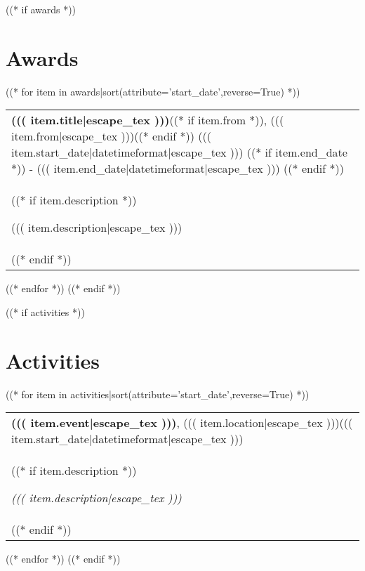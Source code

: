 \documentclass[a4paper, oneside, final]{scrartcl} %
\begin{document}
\begin{center}
((* if awards *))
\section{Awards}

((* for item in awards|sort(attribute='start_date',reverse=True) *))
\begin{tabularx}{0.97\linewidth}{X}
\textbf{((( item.title|escape_tex )))}((* if item.from *)), ((( item.from|escape_tex )))((* endif *)) \hfill ((( item.start_date|datetimeformat|escape_tex ))) ((* if item.end_date *)) - ((( item.end_date|datetimeformat|escape_tex ))) ((* endif *)) \\
((* if item.description *)) \hspace*{\fill}\begin{minipage}{\linewidth-0.5cm} ((( item.description|escape_tex ))) \end{minipage} \\((* endif *))
\end{tabularx}

\vspace{6pt}

((* endfor *))
((* endif *))


((* if activities *))
\section{Activities}

((* for item in activities|sort(attribute='start_date',reverse=True) *))
\begin{tabularx}{0.97\linewidth}{X}
\textbf{((( item.event|escape_tex )))}, ((( item.location|escape_tex )))\hfill ((( item.start_date|datetimeformat|escape_tex ))) \\
((* if item.description *)) \hspace*{\fill}\begin{minipage}{\linewidth-0.5cm}\textit{((( item.description|escape_tex ))) } \end{minipage} \\((* endif *))
\end{tabularx}

\vspace{6pt}

((* endfor *))
((* endif *))


\end{center}
\end{document}
